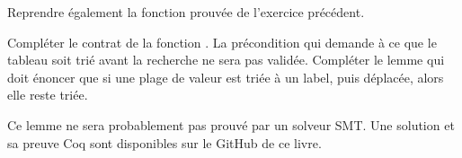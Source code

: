 Reprendre également la fonction prouvée  de l'exercice
précédent.


Compléter le contrat de la fonction . La 
précondition qui demande à ce que le tableau soit trié avant la recherche ne 
sera pas validée. Compléter le lemme  qui
doit énoncer que si une plage de valeur est triée à un label, puis déplacée,
alors elle reste triée.


Ce lemme ne sera probablement pas prouvé par un solveur SMT. Une solution et
sa preuve Coq sont disponibles sur le GitHub de ce livre.
